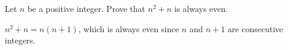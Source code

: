 \question Let $n$ be a positive integer. Prove that $n^2 + n$ is always even.
\begin{solution}
$n^2 + n = n(n+1)$, which is always even since $n$ and $n+1$ are consecutive integers.
\end{solution}
